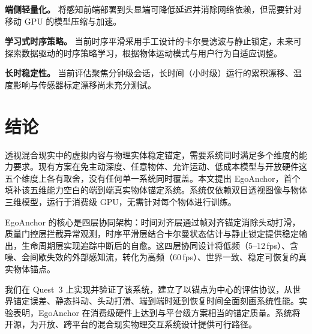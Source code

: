 \documentclass[review]{vgtc}
\begin{document}
\noindent\textbf{端侧轻量化。} 将感知前端部署到头显端可降低延迟并消除网络依赖，但需要针对移动 GPU 的模型压缩与加速。

\noindent\textbf{学习式时序策略。} 当前时序平滑采用手工设计的卡尔曼滤波与静止锁定，未来可探索数据驱动的时序策略学习，根据物体运动模式与用户行为自适应调整。

\noindent\textbf{长时稳定性。} 当前评估聚焦分钟级会话，长时间（小时级）运行的累积漂移、温度影响与传感器标定漂移尚未充分测试。

\section{结论}

透视混合现实中的虚拟内容与物理实体稳定锚定，需要系统同时满足多个维度的能力要求。现有方案在免主动深度、任意物体、允许运动、低成本模型与开放硬件这五个维度上各有取舍，没有任何单一系统同时覆盖。本文提出 EgoAnchor，首个填补该五维能力空白的端到端真实物体锚定系统。系统仅依赖双目透视图像与物体三维模型，运行于消费级 GPU，无需针对每个物体进行训练。

EgoAnchor 的核心是四层协同架构：时间对齐层通过帧对齐锚定消除头动打滑，质量门控层拦截异常观测，时序平滑层结合卡尔曼状态估计与静止锁定提供稳定输出，生命周期层实现追踪中断后的自愈。这四层协同设计将低频（5--12\,fps）、含噪、会间歇失效的外部感知流，转化为高频（60\,fps）、世界一致、稳定可恢复的真实物体锚点。

我们在 Quest~3 上实现并验证了该系统，建立了以锚点为中心的评估协议，从世界锚定误差、静态抖动、头动打滑、端到端时延到恢复时间全面刻画系统性能。实验表明，EgoAnchor 在消费级硬件上达到与平台级方案相当的锚定质量。系统将开源，为开放、跨平台的混合现实物理交互系统设计提供可行路径。

\nocite{*}


\end{document}
